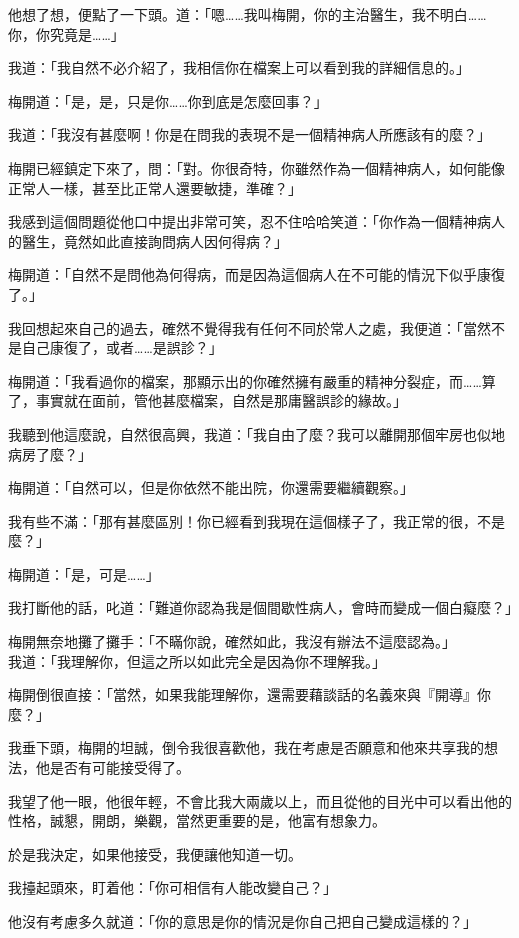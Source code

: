 他想了想，便點了一下頭。道：「嗯……我叫梅開，你的主治醫生，我不明白……你，你究竟是……」

我道：「我自然不必介紹了，我相信你在檔案上可以看到我的詳細信息的。」

梅開道：「是，是，只是你……你到底是怎麼回事？」

我道：「我沒有甚麼啊！你是在問我的表現不是一個精神病人所應該有的麼？」

梅開已經鎮定下來了，問：「對。你很奇特，你雖然作為一個精神病人，如何能像正常人一樣，甚至比正常人還要敏捷，準確？」

我感到這個問題從他口中提出非常可笑，忍不住哈哈笑道：「你作為一個精神病人的醫生，竟然如此直接詢問病人因何得病？」

梅開道：「自然不是問他為何得病，而是因為這個病人在不可能的情況下似乎康復了。」

我回想起來自己的過去，確然不覺得我有任何不同於常人之處，我便道：「當然不是自己康復了，或者……是誤診？」

梅開道：「我看過你的檔案，那顯示出的你確然擁有嚴重的精神分裂症，而……算了，事實就在面前，管他甚麼檔案，自然是那庸醫誤診的緣故。」

我聽到他這麼說，自然很高興，我道：「我自由了麼？我可以離開那個牢房也似地病房了麼？」

梅開道：「自然可以，但是你依然不能出院，你還需要繼續觀察。」

我有些不滿：「那有甚麼區別！你已經看到我現在這個樣子了，我正常的很，不是麼？」

梅開道：「是，可是……」

我打斷他的話，叱道：「難道你認為我是個間歇性病人，會時而變成一個白癡麼？」

梅開無奈地攤了攤手：「不瞞你說，確然如此，我沒有辦法不這麼認為。」
\\


我道：「我理解你，但這之所以如此完全是因為你不理解我。」

梅開倒很直接：「當然，如果我能理解你，還需要藉談話的名義來與『開導』你麼？」

我垂下頭，梅開的坦誠，倒令我很喜歡他，我在考慮是否願意和他來共享我的想法，他是否有可能接受得了。

我望了他一眼，他很年輕，不會比我大兩歲以上，而且從他的目光中可以看出他的性格，誠懇，開朗，樂觀，當然更重要的是，他富有想象力。

於是我決定，如果他接受，我便讓他知道一切。

我擡起頭來，盯着他：「你可相信有人能改變自己？」

他沒有考慮多久就道：「你的意思是你的情況是你自己把自己變成這樣的？」

